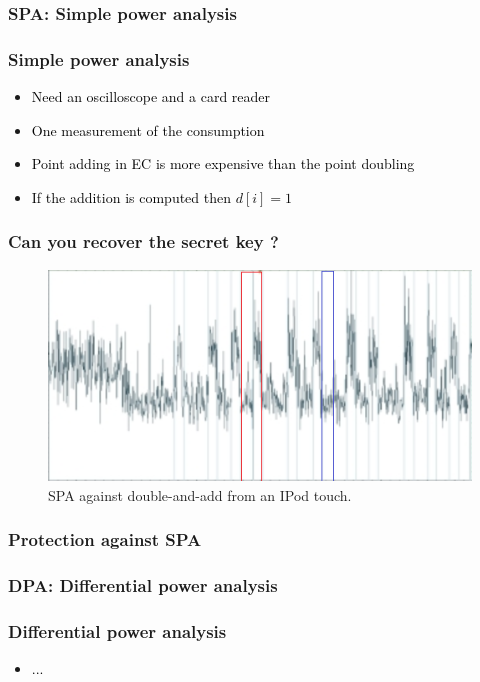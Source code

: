 \documentclass{beamer}
\begin{document}
        \subsubsection{SPA: Simple power analysis}

\begin{frame}
    \frametitle{Simple power analysis}
    \begin{itemize}
        \item \textcolor{black} {Need an oscilloscope and a card reader}
	\item \textcolor{black} {One measurement of the consumption} 
	\item \textcolor{black} {Point adding  in EC is more expensive than the point doubling} 
	\item \textcolor{black} {If the addition is computed then $d[i] = 1$}
    \end{itemize}
\end{frame}

\begin{frame}
    \frametitle{Can you recover the secret key ?}
    \begin{figure}
        \centering
        \includegraphics[scale=0.6]{img/spa.png}
        \caption{SPA against double-and-add from an IPod touch.}
    \end{figure}
\end{frame}

\begin{frame}
    \frametitle{Protection against SPA}

\end{frame}


	\subsubsection{DPA: Differential power analysis}

\begin{frame}
    \frametitle{Differential power analysis}
    \begin{itemize}
        \item \textcolor{black} {...}
    \end{itemize}
\end{frame}
\end{document}
